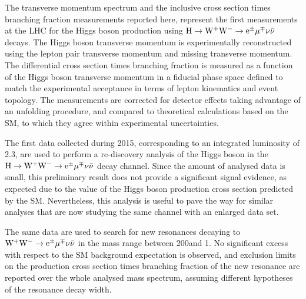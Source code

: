 The transverse momentum spectrum and the inclusive cross section times branching fraction measurements reported here, represent the first measurements at the LHC for the Higgs boson production using $\rm{H}\to\rm{W^+W^-}\to e^{\pm} \mu^{\mp}\nu\bar{\nu}$ decays.
The Higgs boson transverse momentum is experimentally reconstructed using the lepton pair transverse momentum and missing transverse momentum. The differential cross section times branching fraction is measured as a function of the Higgs boson transverse momentum in a fiducial phase space defined to match the experimental acceptance in terms of lepton kinematics and event topology. The measurements are corrected for detector effects taking advantage of an unfolding procedure, and compared to theoretical calculations based on the SM, to which they agree within experimental uncertainties.

The first data collected during 2015, corresponding to an integrated luminosity of 2.3\ifb, are used to perform a re-discovery analysis of the Higgs boson in the $\rm{H}\to\rm{W^+W^-}\to e^{\pm} \mu^{\mp}\nu\bar{\nu}$ decay channel. Since the amount of analysed data is small, this preliminary result does not provide a significant signal evidence, as expected due to the value of the Higgs boson production cross section predicted by the SM. Nevertheless, this analysis is useful to pave the way for similar analyses that are now studying the same channel with an enlarged data set.

The same data are used to search for new resonances decaying to $\rm{W^+W^-}\to e^{\pm} \mu^{\mp}\nu\bar{\nu}$ in the mass range between 200\GeV and 1\TeV. No significant excess with respect to the SM background expectation is observed, and exclusion limits on the production cross section times branching fraction of the new resonance are reported over the whole analysed mass spectrum, assuming different hypotheses of the resonance decay width.
